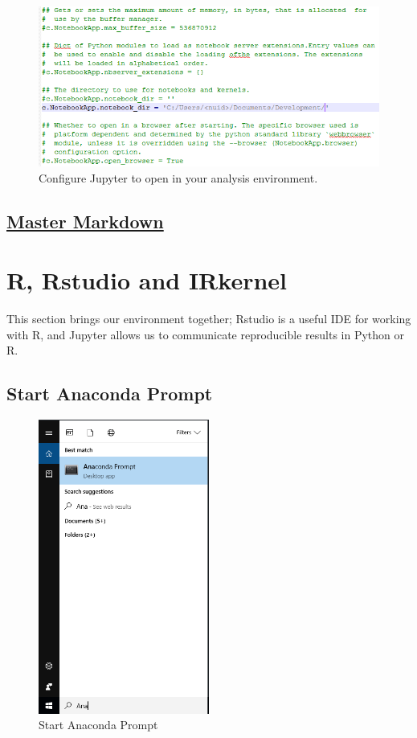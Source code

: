 \documentclass{report}
\begin{document}
\begin{figure}[H]
\centering
\includegraphics{./images/notebook_dir.PNG}
\caption{Configure Jupyter to open in your analysis environment.}
\end{figure}

\section*{\texorpdfstring{
\href{https://guides.github.com/features/mastering-markdown/}{Master
Markdown}}{Step N. Master Markdown}}

\chapter*{R, Rstudio and IRkernel}

This section brings our environment together; Rstudio is a useful IDE for working with R, and Jupyter allows us to communicate reproducible results in Python or R.

\section*{Start Anaconda Prompt}

\begin{figure}[H]
\centering
\includegraphics[width=0.5\textwidth]{./images/Prompt.PNG}
\caption{Start Anaconda Prompt}
\end{figure}
\end{document}
